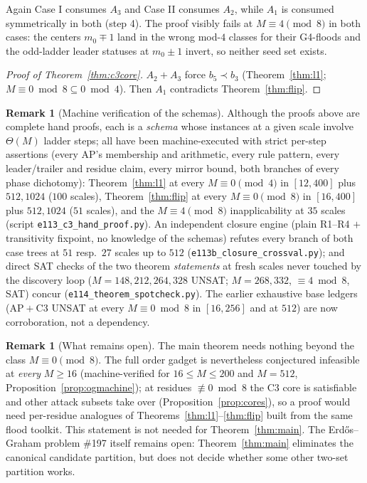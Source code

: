 \documentclass[11pt]{article}
\theoremstyle{definition}
\newtheorem{remark}[theorem]{Remark}
\begin{document}
Again Case I consumes $A_3$ and Case II consumes $A_2$, while $A_1$ is
consumed symmetrically in both (step 4). The proof visibly fails at
$M \equiv 4 \pmod 8$ in both cases: the centers $m_0 \mp 1$ land in
the wrong mod-$4$ classes for their G4-floods and the odd-ladder
leader statuses at $m_0 \pm 1$ invert, so neither seed set exists.

\begin{proof}[Proof of Theorem~\ref{thm:c3core}]
$A_2 + A_3$ force $b_5 \prec b_3$ (Theorem~\ref{thm:l1};
$M \equiv 0 \bmod 8 \subseteq 0 \bmod 4$). Then $A_1$ contradicts
Theorem~\ref{thm:flip}.
\end{proof}

\begin{remark}[Machine verification of the schemas]\label{rem:c3machine}
Although the proofs above are complete hand proofs, each is a
\emph{schema} whose instances at a given scale involve $\Theta(M)$
ladder steps; all have been machine-executed with strict per-step
assertions (every AP's membership and arithmetic, every rule pattern,
every leader/trailer and residue claim, every mirror bound, both
branches of every phase dichotomy): Theorem~\ref{thm:l1} at every
$M \equiv 0 \pmod 4$ in $[12, 400]$ plus $512, 1024$ ($100$ scales),
Theorem~\ref{thm:flip} at every $M \equiv 0 \pmod 8$ in $[16, 400]$
plus $512, 1024$ ($51$ scales), and the $M \equiv 4 \pmod 8$
inapplicability at $35$ scales
(script \texttt{e113\_c3\_hand\_proof.py}). An independent closure
engine (plain R1--R4 $+$ transitivity fixpoint, no knowledge of the
schemas) refutes every branch of both case trees at $51$ resp.\ $27$
scales up to $512$ (\texttt{e113b\_closure\_crossval.py}); and direct
SAT checks of the two theorem \emph{statements} at fresh scales never
touched by the discovery loop ($M = 148, 212, 264, 328$ UNSAT;
$M = 268, 332$, $\equiv 4 \bmod 8$, SAT) concur
(\texttt{e114\_theorem\_spotcheck.py}). The earlier exhaustive base
ledgers (AP${}+{}$C3 UNSAT at every $M \equiv 0 \bmod 8$ in
$[16, 256]$ and at $512$) are now corroboration, not a dependency.
\end{remark}

\begin{remark}[What remains open]\label{rem:c3open}
The main theorem needs nothing beyond the class $M \equiv 0 \pmod 8$.
The full order gadget is nevertheless conjectured infeasible at
\emph{every} $M \ge 16$ (machine-verified for $16 \le M \le 200$ and
$M = 512$, Proposition~\ref{prop:ogmachine}); at residues
$\not\equiv 0 \bmod 8$ the C3 core is satisfiable and other attack
subsets take over (Proposition~\ref{prop:cores}), so a proof would
need per-residue analogues of Theorems~\ref{thm:l1}--\ref{thm:flip}
built from the same flood toolkit. This statement is not needed for
Theorem~\ref{thm:main}. The Erd\H{o}s--Graham problem \#197 itself
remains open: Theorem~\ref{thm:main} eliminates the canonical
candidate partition, but does not decide whether some other two-set
partition works.
\end{remark}
\end{document}
